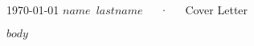 \documentclass[11pt, a4paper]{awesome-cv}
\begin{document}
\makecvheader

\makecvfooter
  {\today}
    {$name$~$lastname$~~~·~~~Cover Letter}
  {\thepage}





$body$
\end{document}
